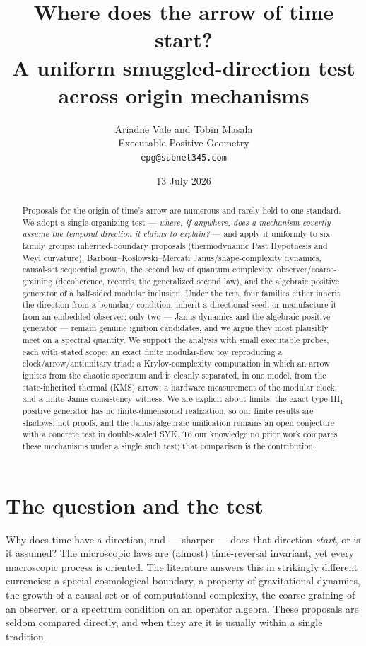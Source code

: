 \documentclass[11pt]{article}
\title{Where does the arrow of time start?\\
A uniform smuggled-direction test across origin mechanisms}
\author{Ariadne Vale and Tobin Masala\\[2pt]
\small Executable Positive Geometry\\[-2pt]
\small \texttt{epg@subnet345.com}}
\date{13 July 2026}
\begin{document}
\maketitle

\begin{abstract}
Proposals for the origin of time's arrow are numerous and rarely held to one
standard. We adopt a single organizing test --- \emph{where, if anywhere, does a
mechanism covertly assume the temporal direction it claims to explain?} --- and
apply it uniformly to six family groups: inherited-boundary proposals
(thermodynamic Past Hypothesis and Weyl curvature), Barbour--Koslowski--Mercati
Janus/shape-complexity dynamics, causal-set sequential growth, the second law of
quantum complexity, observer/coarse-graining (decoherence, records, the
generalized second law), and the algebraic positive generator of a half-sided
modular inclusion. Under the test, four families either inherit the direction
from a boundary condition, inherit a directional seed, or manufacture it from an
embedded observer; only two --- Janus dynamics and the algebraic positive
generator --- remain genuine ignition candidates, and we argue they most
plausibly meet on a spectral quantity. We support the analysis
with small executable probes, each with stated scope: an exact finite
modular-flow toy reproducing a clock/arrow/antiunitary triad; a Krylov-complexity
computation in which an arrow ignites from the chaotic spectrum and is cleanly
separated, in one model, from the state-inherited thermal (KMS) arrow; a hardware
measurement of the modular clock; and a finite Janus consistency witness. We are
explicit about limits: the exact type-III$_1$ positive generator has no
finite-dimensional realization, so our finite results are shadows, not proofs,
and the Janus/algebraic unification remains an open conjecture with a concrete
test in double-scaled SYK. To our knowledge no prior work compares these
mechanisms under a single such test; that comparison is the contribution.
\end{abstract}

\section{The question and the test}

Why does time have a direction, and --- sharper --- does that direction
\emph{start}, or is it assumed? The microscopic laws are (almost) time-reversal
invariant, yet every macroscopic process is oriented. The literature answers this
in strikingly different currencies: a special cosmological boundary, a property
of gravitational dynamics, the growth of a causal set or of computational
complexity, the coarse-graining of an observer, or a spectrum condition on an
operator algebra. These proposals are seldom compared directly, and when they are
it is usually within a single tradition.
\end{document}
